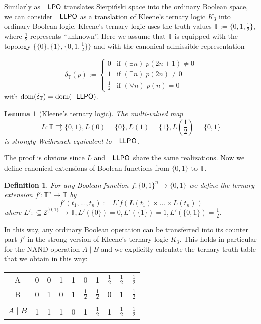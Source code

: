\documentclass[jsl,10pt]{noasl}
\def\IT{{\mathbb{T}}}
\def\In{\subseteq}
\def\mto{\rightrightarrows}
\def\dom{{\rm dom}}
\def\LPO{\text{\rm\sffamily LPO}}
\def\LLPO{\text{\rm\sffamily LLPO}}
\def\LPO{\text{\rm\sffamily LPO}}
\def\LLPO{\text{\rm\sffamily LLPO}}
\newtheorem{lemma}[proposition]{Lemma}
\newtheorem{definition}[proposition]{Definition}
\begin{document}
Similarly as $\LPO$ translates Sierpi{\'n}ski space into the ordinary Boolean space,
we can consider $\LLPO$ as a translation of Kleene's ternary logic $K_3$ into ordinary
Boolean logic. Kleene's ternary logic uses the truth values $\IT:=\{0,1,\frac{1}{2}\}$,
where $\frac{1}{2}$ represents ``unknown''. Here we assume that $\IT$ is equipped with
the topology $\{\{0\},\{1\},\{0,1,\frac{1}{2}\}\}$ and with the canonical admissible
representation

\[\delta_\IT(p):=\left\{\begin{array}{ll}
  0 & \mbox{if $(\exists n)\;p(2n+1)\not=0$}\\
  1 & \mbox{if $(\exists n)\;p(2n)\not=0$}\\
  \frac{1}{2} & \mbox{if $(\forall n)\;p(n)=0$}
\end{array}\right.\]
with $\dom(\delta_\IT)=\dom(\LLPO)$. 

\begin{lemma}[Kleene's ternary logic]
The multi-valued map 
\[\mbox{$L:\IT\mto\{0,1\},L(0)=\{0\},L(1)=\{1\},L(\frac{1}{2})=\{0,1\}$}\]
is strongly Weihrauch equivalent to $\LLPO$.
\end{lemma}

The proof is obvious since $L$ and $\LLPO$ share the same realizations.
Now we define canonical extensions of Boolean functions from $\{0,1\}$ to $\IT$.

\begin{definition}\rm
For any Boolean function $f:\{0,1\}^n\to\{0,1\}$ we define the {\em ternary extension}
$f':\IT^n\to\IT$ by
\[f'(t_1,...,t_n):=L'f(L(t_1)\times...\times L(t_n))\]
where $L':\In2^{\{0,1\}}\to\IT,L'(\{0\})=0,L'(\{1\})=1, L'(\{0,1\})=\frac{1}{2}$.
\end{definition}

In this way, any ordinary Boolean operation can be transferred into its
counter part $f'$ in the strong version of Kleene's ternary logic $K_3$.
This holds in particular for the NAND operation $A\mid B$ and we explicitly
calculate the ternary truth table
that we obtain in this way:

\begin{table}[h]
\begin{tabular}{c|ccccccccc}
A       & 0 & 0 & 1 & 1 & 0 & 1 & $\frac{1}{2}$ & $\frac{1}{2}$ & $\frac{1}{2}$\\[0.1cm]
B       & 0 & 1 & 0 & 1 & $\frac{1}{2}$ & $\frac{1}{2}$ & 0 & 1 & $\frac{1}{2}$\\[0.1cm]\hline\\[-0.3cm]
$A\mid B$ & 1 & 1 & 1 & 0 & 1 & $\frac{1}{2}$ & 1 & $\frac{1}{2}$ & $\frac{1}{2}$
\end{tabular}
\end{table}
\end{document}
